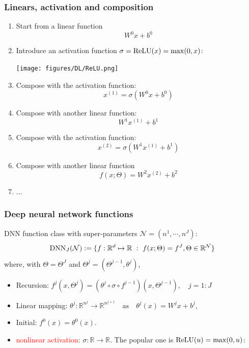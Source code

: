 \documentclass{beamer}
\newcommand{\red}[1]{\textcolor{red}{#1}}
\begin{document}
\begin{CJK*}{UTF8}{gbsn}
\begin{frame}
  \frametitle{Linears, activation and composition}
\tiny
\pause 
\begin{enumerate}
\item Start from a linear function
$$
W^0x+b^0
$$
\pause 
\item Introduce an activation function $\sigma={\rm ReLU}(x)=\max(0,x)$:
	\begin{center}
		\texttt{[image: figures/DL/ReLU.png]} 
	\end{center}
\pause 
\item Compose with the activation function:
$$
x^{(1)}  = \sigma(W^0x+b^0)
$$
\pause 
\item Compose with another linear function:
$$
W^1x^{(1)}+b^1
$$
\pause 
\item Compose with the activation function:
$$
x^{(2)}=\sigma(W^1x^{(1)}+b^1)
$$
\pause 
\item Compose with another linear function
$$
f(x;\Theta)= W^2x^{(2)}+b^2
$$
\pause 
\item $\ldots$
\end{enumerate}
\end{frame}
\begin{frame}
\frametitle{Deep neural network functions}
DNN function class with super-parameters $\mathcal{N} = (n^1,\cdots,n^J)$: 
\begin{equation}\label{key}
{\rm DNN}_{J}({\mathcal{N}}) := \{f:\mathbb R^d\mapsto \mathbb R ~:~ f(x; \Theta) = f^J, \Theta \in \mathbb{R}^{\mathcal{N}}\}
\end{equation} 
where, with $\Theta=\Theta^J$ and $\Theta^j=(\Theta^{j-1},\theta^j)$, 
\pause
\begin{itemize}
	\item Recursion: $f^j(x,\Theta^j) = (\theta^j\circ \sigma \circ
	f^{j-1})(x,\Theta^{j-1}), \quad j=1:J$
\pause 
	\item Linear mapping: 
	$
	\theta^j: \mathbb{R}^{n^j} \to \mathbb{R}^{n^{j+1}} \quad \text{as} \quad \theta^j(x) =  W^j x + b^j,
	$
\pause 
	\item Initial: $f^0(x)=\theta^0(x).$
\pause 
	\item \red{nonlinear activation}:  $\sigma: \mathbb{R} \to \mathbb{R}$.   The
	popular one is ${\rm ReLU}(u)=\max(0,u)$:
\end{itemize}
\end{frame}





\end{CJK*}
\end{document}
